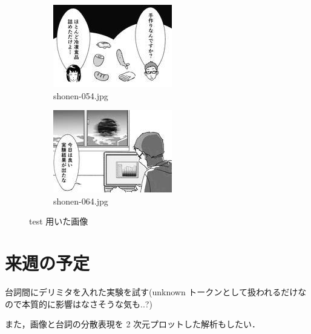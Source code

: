 \documentclass[onecolumn]{ujarticle}   %
\begin{document}
	\begin{figure}[h]
		\centering
		\begin{subfigure}{0.49\columnwidth}
			\centering
			\includegraphics[width=0.9\columnwidth]{data/shonen-054.jpg}
				\caption{shonen-054.jpg}
		\end{subfigure}
		\begin{subfigure}{0.49\columnwidth}
			\centering
			\includegraphics[width=0.9\columnwidth]{data/shonen-064.jpg}
				\caption{shonen-064.jpg}
		\end{subfigure}
		\caption{test 用いた画像}
		\label{fig:target}
	\end{figure}


	\section{来週の予定}\noindent
	台詞間にデリミタを入れた実験を試す(unknown トークンとして扱われるだけなので本質的に影響はなさそうな気も..?)

	また，画像と台詞の分散表現を 2 次元プロットした解析もしたい．
\end{document}
